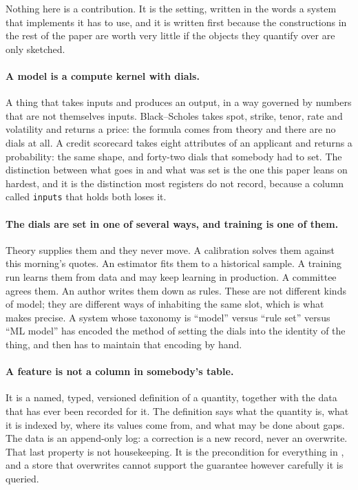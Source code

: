 \documentclass[11pt,a4paper]{article}
\renewcommand{\_}{\oldunderscore\allowbreak}
\theoremstyle{plain}
\theoremstyle{definition}
\theoremstyle{definition}
\theoremstyle{remark}
\begin{document}
Nothing here is a contribution. It is the setting, written in the words a system that implements it has
to use, and it is written first because the constructions in the rest of the paper are worth very little
if the objects they quantify over are only sketched.

\paragraph{A model is a compute kernel with dials.} A thing that takes inputs and produces an output, in
a way governed by numbers that are not themselves inputs. Black--Scholes takes spot, strike, tenor, rate
and volatility and returns a price: the formula comes from theory and there are no dials at all. A
credit scorecard takes eight attributes of an applicant and returns a probability: the same shape, and
forty-two dials that somebody had to set. The distinction between what goes in and what was set is the
one this paper leans on hardest, and it is the distinction most registers do not record, because a
column called \texttt{inputs} that holds both loses it.

\paragraph{The dials are set in one of several ways, and training is one of them.} Theory supplies them
and they never move. A calibration solves them against this morning's quotes. An estimator fits them to
a historical sample. A training run learns them from data and may keep learning in production. A
committee agrees them. An author writes them down as rules. These are not different kinds of model;
they are different ways of inhabiting the same slot, which is what  makes precise. A
system whose taxonomy is ``model'' versus ``rule set'' versus ``ML model'' has encoded the method of
setting the dials into the identity of the thing, and then has to maintain that encoding by hand.

\paragraph{A feature is not a column in somebody's table.} It is a named, typed, versioned definition of
a quantity, together with the data that has ever been recorded for it. The definition says what the
quantity is, what it is indexed by, where its values come from, and what may be done about gaps. The
data is an append-only log: a correction is a new record, never an overwrite. That last property is not
housekeeping. It is the precondition for everything in , and a store that overwrites
cannot support the guarantee however carefully it is queried.
\end{document}
